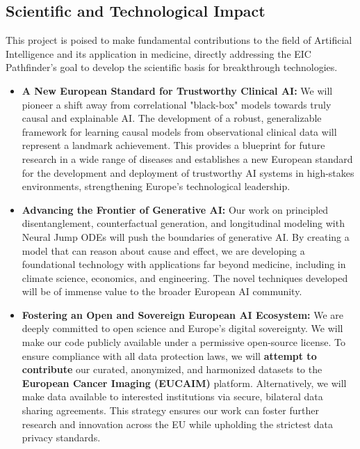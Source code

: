 \documentclass[11pt, a4paper]{article}
\begin{document}
\subsection{Scientific and Technological Impact}
This project is poised to make fundamental contributions to the field of Artificial Intelligence and its application in medicine, directly addressing the EIC Pathfinder's goal to develop the scientific basis for breakthrough technologies.
\begin{itemize}
    \item \textbf{A New European Standard for Trustworthy Clinical AI:} We will pioneer a shift away from correlational "black-box" models towards truly causal and explainable AI. The development of a robust, generalizable framework for learning causal models from observational clinical data will represent a landmark achievement. This provides a blueprint for future research in a wide range of diseases and establishes a new European standard for the development and deployment of trustworthy AI systems in high-stakes environments, strengthening Europe's technological leadership.
    \item \textbf{Advancing the Frontier of Generative AI:} Our work on principled disentanglement, counterfactual generation, and longitudinal modeling with Neural Jump ODEs will push the boundaries of generative AI. By creating a model that can reason about cause and effect, we are developing a foundational technology with applications far beyond medicine, including in climate science, economics, and engineering. The novel techniques developed will be of immense value to the broader European AI community.
    \item \textbf{Fostering an Open and Sovereign European AI Ecosystem:} We are deeply committed to open science and Europe's digital sovereignty. We will make our code publicly available under a permissive open-source license. To ensure compliance with all data protection laws, we will \textbf{attempt to contribute} our curated, anonymized, and harmonized datasets to the \textbf{European Cancer Imaging (EUCAIM)} platform. Alternatively, we will make data available to interested institutions via secure, bilateral data sharing agreements. This strategy ensures our work can foster further research and innovation across the EU while upholding the strictest data privacy standards.
\end{itemize}
\end{document}
